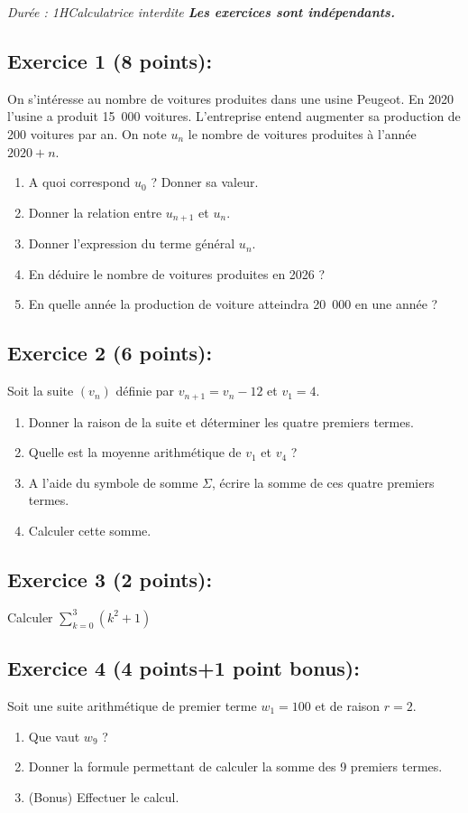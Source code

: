 \documentclass[a4paper,12pt, french]{article}
\date{}
\begin{document}
\name

\emph{Durée : 1H\qquad Calculatrice interdite \qquad \textbf{Les exercices sont indépendants.}}

\vspace{-3mm}

\subsection*{Exercice 1 (8 points):}
On s'intéresse au nombre de voitures produites dans une usine Peugeot. En 2020 l'usine a produit 15\ 000 voitures. L'entreprise entend augmenter sa production de 200 voitures par an. On note $u_n$ le nombre de voitures produites à l'année $2020+n$.

\begin{enumerate}
    \item A quoi correspond $u_0$ ? Donner sa valeur.
    \item Donner la relation entre $u_{n+1}$ et $u_n$.
    \item Donner l'expression du terme général $u_n$.
    \item En déduire le nombre de voitures produites en 2026 ?
    \item En quelle année la production de voiture atteindra 20\ 000 en une année ?
\end{enumerate}

\subsection*{Exercice 2 (6 points):}
Soit la suite $(v_n)$ définie par $v_{n+1} = v_n-12$ et $v_1=4$.

\begin{enumerate}
    \item Donner la raison de la suite et déterminer les quatre premiers termes.
    \item Quelle est la moyenne arithmétique de $v_1$ et $v_4$ ?
    \item A l'aide du symbole de somme $\Sigma$, écrire la somme de ces quatre premiers termes.
    \item Calculer cette somme.
\end{enumerate}

\subsection*{Exercice 3 (2 points):}
Calculer $\sum_{k=0}^{3} (k^2+1)$

\subsection*{Exercice 4 (4 points+1 point bonus):}
Soit une suite arithmétique de premier terme $w_1 = 100$ et de raison $r=2$.
\begin{enumerate}
    \item Que vaut $w_{9}$ ?
    \item Donner la formule permettant de calculer la somme des 9 premiers termes.
    \item (Bonus) Effectuer le calcul.
\end{enumerate}

\end{document}
